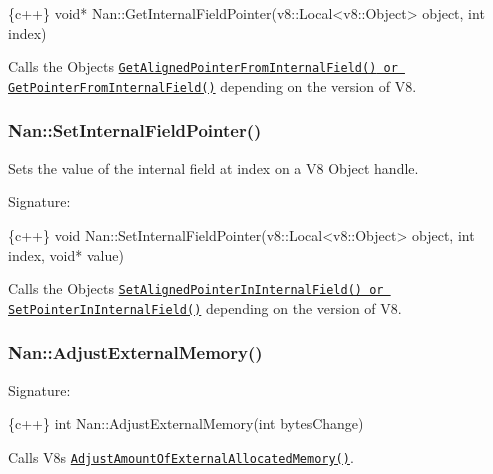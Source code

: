 \begin{DoxyCode}
\{c++\}
void* Nan::GetInternalFieldPointer(v8::Local<v8::Object> object, int index) 
\end{DoxyCode}


Calls the Object\textquotesingle{}s \href{https://v8docs.nodesource.com/io.js-3.0/db/d85/classv8_1_1_object.html#ab3c57184263cf29963ef0017bec82281}{\tt {\ttfamily Get\+Aligned\+Pointer\+From\+Internal\+Field()} or {\ttfamily Get\+Pointer\+From\+Internal\+Field()}} depending on the version of V8.

\label{_api_nan_set_internal_field_pointer}%
 \subsubsection*{Nan\+::\+Set\+Internal\+Field\+Pointer()}

Sets the value of the internal field at {\ttfamily index} on a V8 {\ttfamily Object} handle.

Signature\+:


\begin{DoxyCode}
\{c++\}
void Nan::SetInternalFieldPointer(v8::Local<v8::Object> object, int index, void* value)
\end{DoxyCode}


Calls the Object\textquotesingle{}s \href{https://v8docs.nodesource.com/io.js-3.0/d5/dda/classv8_1_1_isolate.html#ad7f5dc559866343fe6cd8db1f134d48b}{\tt {\ttfamily Set\+Aligned\+Pointer\+In\+Internal\+Field()} or {\ttfamily Set\+Pointer\+In\+Internal\+Field()}} depending on the version of V8.

\label{_api_nan_adjust_external_memory}%
 \subsubsection*{Nan\+::\+Adjust\+External\+Memory()}

Signature\+:


\begin{DoxyCode}
\{c++\}
int Nan::AdjustExternalMemory(int bytesChange)
\end{DoxyCode}


Calls V8\textquotesingle{}s \href{https://v8docs.nodesource.com/io.js-3.0/d5/dda/classv8_1_1_isolate.html#ae1a59cac60409d3922582c4af675473e}{\tt {\ttfamily Adjust\+Amount\+Of\+External\+Allocated\+Memory()}}. 